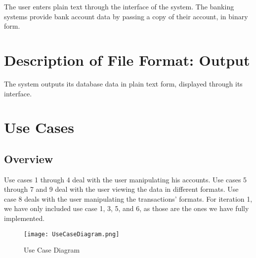 \documentclass[11pt]{article}
\newcounter{use case ID}
\begin{document}
The user enters plain text through the interface of the system. The banking systems provide bank account data by passing a copy of their account, in binary form.

\section{Description of File Format: Output}

The system outputs its database data in plain text form, displayed through its interface.

\section{Use Cases}
\subsection{Overview}
Use cases 1 through 4 deal with the user manipulating his accounts. Use cases 5 through 7 and 9 deal with the user viewing the data in different formats. Use case 8 deals with the user manipulating the transactions' formats. For iteration 1, we have only included use case 1, 3, 5, and 6, as those are the ones we have fully implemented.

\begin{figure}[htbp]
\texttt{[image: UseCaseDiagram.png]}
\caption{Use Case Diagram}
\label{fig:use-case-diagram}
\end{figure}
\end{document}
